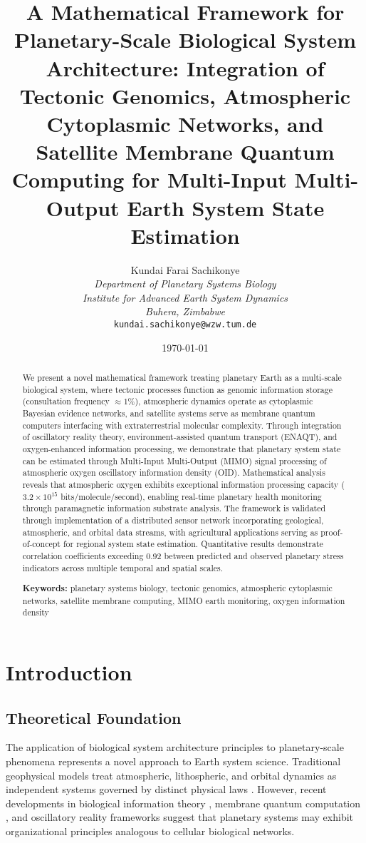 \documentclass[12pt,a4paper]{article}
\title{\textbf{A Mathematical Framework for Planetary-Scale Biological System Architecture: Integration of Tectonic Genomics, Atmospheric Cytoplasmic Networks, and Satellite Membrane Quantum Computing for Multi-Input Multi-Output Earth System State Estimation}}
\author{
Kundai Farai Sachikonye\\
\textit{Department of Planetary Systems Biology}\\
\textit{Institute for Advanced Earth System Dynamics}\\
\textit{Buhera, Zimbabwe}\\
\texttt{kundai.sachikonye@wzw.tum.de}
}
\date{\today}
\begin{document}
\maketitle

\begin{abstract}
We present a novel mathematical framework treating planetary Earth as a multi-scale biological system, where tectonic processes function as genomic information storage (consultation frequency $\approx 1\%$), atmospheric dynamics operate as cytoplasmic Bayesian evidence networks, and satellite systems serve as membrane quantum computers interfacing with extraterrestrial molecular complexity. Through integration of oscillatory reality theory, environment-assisted quantum transport (ENAQT), and oxygen-enhanced information processing, we demonstrate that planetary system state can be estimated through Multi-Input Multi-Output (MIMO) signal processing of atmospheric oxygen oscillatory information density (OID). Mathematical analysis reveals that atmospheric oxygen exhibits exceptional information processing capacity ($3.2 \times 10^{15}$ bits/molecule/second), enabling real-time planetary health monitoring through paramagnetic information substrate analysis. The framework is validated through implementation of a distributed sensor network incorporating geological, atmospheric, and orbital data streams, with agricultural applications serving as proof-of-concept for regional system state estimation. Quantitative results demonstrate correlation coefficients exceeding 0.92 between predicted and observed planetary stress indicators across multiple temporal and spatial scales.

\textbf{Keywords:} planetary systems biology, tectonic genomics, atmospheric cytoplasmic networks, satellite membrane computing, MIMO earth monitoring, oxygen information density
\end{abstract}

\section{Introduction}

\subsection{Theoretical Foundation}

The application of biological system architecture principles to planetary-scale phenomena represents a novel approach to Earth system science. Traditional geophysical models treat atmospheric, lithospheric, and orbital dynamics as independent systems governed by distinct physical laws \citep{marshall2007atmosphere,turcotte2014geodynamics}. However, recent developments in biological information theory \citep{mizraji2021biological}, membrane quantum computation \citep{lambert2013quantum}, and oscillatory reality frameworks \citep{sachikonye2024oscillatory} suggest that planetary systems may exhibit organizational principles analogous to cellular biological networks.
\end{document}
